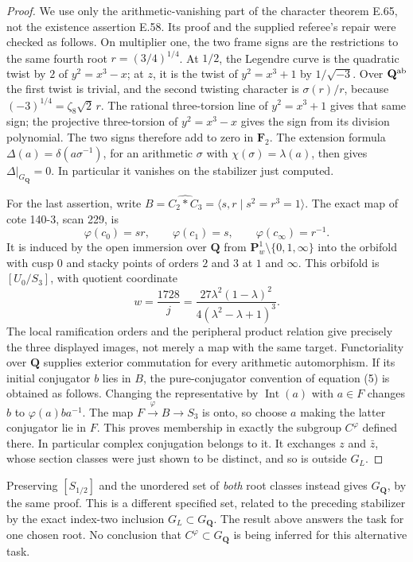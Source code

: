 \begin{proof}
We use only the arithmetic-vanishing part of the
character theorem E.65, not the existence assertion
E.58.  Its proof and the supplied referee's repair
were checked as follows.  On multiplier one, the two
frame signs are the restrictions to the same fourth
root $r=(3/4)^{1/4}$.  At $1/2$, the Legendre curve
is the quadratic twist by $2$ of $y^2=x^3-x$; at
$z$, it is the twist of $y^2=x^3+1$ by
$1/\sqrt{-3}$.  Over $\mathbf Q^{\rm ab}$ the first
twist is trivial, and the second twisting character
is $\sigma(r)/r$, because
$(-3)^{1/4}=\zeta_8\sqrt2\,r$.  The rational
three-torsion line of $y^2=x^3+1$ gives that same
sign; the projective three-torsion of $y^2=x^3-x$
gives the sign from its division polynomial.
The two signs therefore add to zero in $\mathbf F_2$.
The extension formula
$\Delta(a)=\delta(a\sigma^{-1})$, for an arithmetic
$\sigma$ with $\chi(\sigma)=\lambda(a)$, then gives
$\Delta|_{G_{\mathbf Q}}=0$.  In particular it
vanishes on the stabilizer just computed.

For the last assertion, write
$B=\widehat{C_2*C_3}=\langle s,r\mid s^2=r^3=1\rangle$.
The exact map of cote 140-3, scan 229, is
\[
 \varphi(c_0)=sr,\qquad \varphi(c_1)=s,
              \qquad\varphi(c_\infty)=r^{-1}.
\]
It is induced by the open immersion over $\mathbf Q$
from $\mathbf P^1_w\setminus\{0,1,\infty\}$ into
the orbifold with cusp $0$ and stacky points of orders
$2$ and $3$ at $1$ and $\infty$.  This orbifold is
$[U_0/S_3]$, with quotient coordinate
\[
        w=\frac{1728}{j}
          =\frac{27\lambda^2(1-\lambda)^2}
                  {4(\lambda^2-\lambda+1)^3}.
\]
The local ramification orders and the peripheral
product relation give precisely the three displayed
images, not merely a map with the same target.
Functoriality over $\mathbf Q$ supplies exterior
commutation for every arithmetic automorphism.
If its initial conjugator $b$ lies in $B$, the
pure-conjugator convention of equation (5) is obtained
as follows.  Changing the representative by
$\operatorname{Int}(a)$ with $a\in F$ changes $b$
to $\varphi(a)ba^{-1}$.  The map
$F\xrightarrow{\varphi}B\to S_3$ is onto, so
choose $a$ making the latter conjugator lie in $F$.
This proves membership in exactly the subgroup
$C^\varphi$ defined there.  In particular complex
conjugation belongs to it.  It exchanges $z$ and
$\bar z$, whose section classes were just shown to
be distinct, and so is outside $G_L$.
\end{proof}

\begin{remark}
\label{A:root-orbit-stabilizer}
Preserving $[S_{1/2}]$ and the unordered set of
\emph{both} root classes instead gives
$G_{\mathbf Q}$, by the same proof.  This is a
different specified set, related to the preceding
stabilizer by the exact index-two inclusion
$G_L\subset G_{\mathbf Q}$.  The result above answers
the task for one chosen root.  No conclusion that
$C^\varphi\subset G_{\mathbf Q}$ is being inferred
for this alternative task.
\end{remark}

